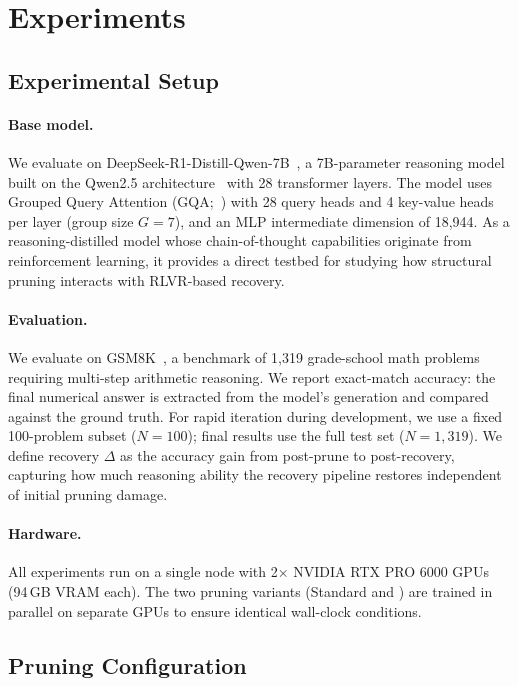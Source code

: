 
\section{Experiments}
\label{sec:experiments}

\subsection{Experimental Setup}
\label{sec:exp_setup}

\paragraph{Base model.}
We evaluate \rasp{} on DeepSeek-R1-Distill-Qwen-7B~\citep{deepseek2025r1}, a 7B-parameter reasoning model built on the Qwen2.5 architecture~\citep{qwen2.5} with 28 transformer layers.
The model uses Grouped Query Attention (GQA;~\citealp{ainslie2023gqa}) with 28 query heads and 4 key-value heads per layer (group size $G{=}7$), and an MLP intermediate dimension of 18{,}944.
As a reasoning-distilled model whose chain-of-thought capabilities originate from reinforcement learning, it provides a direct testbed for studying how structural pruning interacts with RLVR-based recovery.

\paragraph{Evaluation.}
We evaluate on GSM8K~\citep{cobbe2021gsm8k}, a benchmark of 1{,}319 grade-school math problems requiring multi-step arithmetic reasoning.
We report exact-match accuracy: the final numerical answer is extracted from the model's generation and compared against the ground truth.
For rapid iteration during development, we use a fixed 100-problem subset ($N{=}100$); final results use the full test set ($N{=}1{,}319$).
We define recovery $\Delta$ as the accuracy gain from post-prune to post-recovery, capturing how much reasoning ability the recovery pipeline restores independent of initial pruning damage.

\paragraph{Hardware.}
All experiments run on a single node with 2$\times$ NVIDIA RTX PRO 6000 GPUs (94\,GB VRAM each).
The two pruning variants (Standard and \rasp{}) are trained in parallel on separate GPUs to ensure identical wall-clock conditions.

\subsection{Pruning Configuration}
\label{sec:pruning_config}

